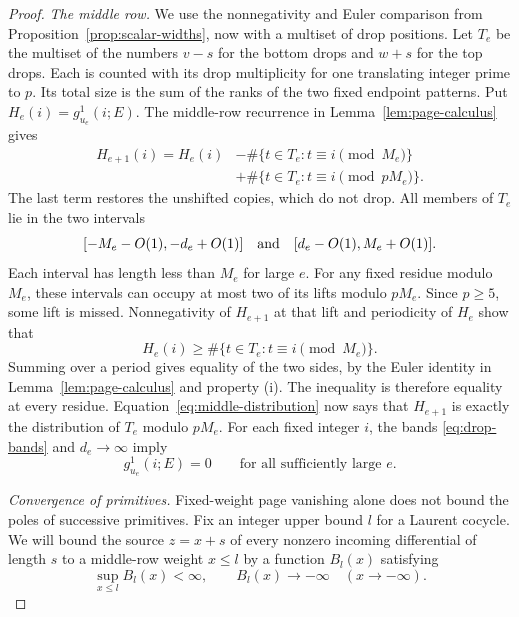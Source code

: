 \begin{proof}
\medskip\noindent
\emph{The middle row.}
We use the nonnegativity and Euler comparison from
Proposition~\ref{prop:scalar-widths}, now with a multiset of drop
positions.
Let $T_e$ be the multiset of the numbers $v-s$ for the bottom
drops and $w+s$ for the top drops.  Each is counted with its drop
multiplicity for one translating integer prime to $p$.
Its total size is the sum of the ranks of the two fixed endpoint
patterns.  Put $H_e(i)=g^1_{u_e}(i;E)$.  The middle-row recurrence
in Lemma~\ref{lem:page-calculus} gives
\begin{equation}\label{eq:middle-distribution}
\begin{split}
 H_{e+1}(i)=H_e(i)
 &-\#\{t\in T_e:t\equiv i\pmod{M_e}\}\\
 &+\#\{t\in T_e:t\equiv i\pmod{pM_e}\}.
\end{split}
\end{equation}
The last term restores the unshifted copies, which do not drop.
All members of $T_e$ lie in the two intervals
\begin{equation}\label{eq:drop-bands}
 [-M_e-O(1),-d_e+O(1)]
 \quad\hbox{and}\quad
 [d_e-O(1),M_e+O(1)].
\end{equation}
Each interval has length less than $M_e$ for large $e$.
For any fixed residue modulo $M_e$, these intervals can occupy
at most two of its lifts modulo $pM_e$.  Since $p\ge5$, some lift
is missed.  Nonnegativity of $H_{e+1}$ at that lift and periodicity
of $H_e$ show that
\[
 H_e(i)\ge\#\{t\in T_e:t\equiv i\pmod{M_e}\}.
\]
Summing over a period gives equality of the two sides, by the Euler
identity in Lemma~\ref{lem:page-calculus} and property (i).
The inequality is therefore equality at every residue.
Equation~\eqref{eq:middle-distribution} now says that $H_{e+1}$
is exactly the distribution of $T_e$ modulo $pM_e$.
For each fixed integer $i$, the bands \eqref{eq:drop-bands} and
$d_e\to\infty$ imply
\begin{equation}\label{eq:fixed-weight-vanishing}
 g^1_{u_e}(i;E)=0\qquad\text{for all sufficiently large }e.
\end{equation}

\medskip\noindent
\emph{Convergence of primitives.}
Fixed-weight page vanishing alone does not bound the poles of
successive primitives.  Fix an integer upper bound $l$ for a
Laurent cocycle.  We will bound the source $z=x+s$ of every nonzero
incoming differential of length $s$ to a middle-row weight $x\le l$
by a function $B_l(x)$ satisfying
\begin{equation}\label{eq:primitive-cut-bound}
 \sup_{x\le l}B_l(x)<\infty,
 \qquad B_l(x)\longrightarrow-\infty\quad(x\to-\infty).
\end{equation}


\end{proof}
